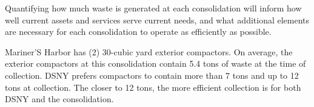 
    Quantifying how much waste is generated at each consolidation will inform how well current assets and services serve current needs, and what additional elements are necessary for each consolidation to operate as efficiently as possible.
    
    Mariner'S Harbor has (2) 30-cubic yard exterior compactors. On average, the exterior compactors at this consolidation contain 5.4 tons of waste at the time of collection. DSNY prefers compactors to contain more than 7 tons and up to 12 tons at collection. The closer to 12 tons, the more efficient collection is for both DSNY and the consolidation.
